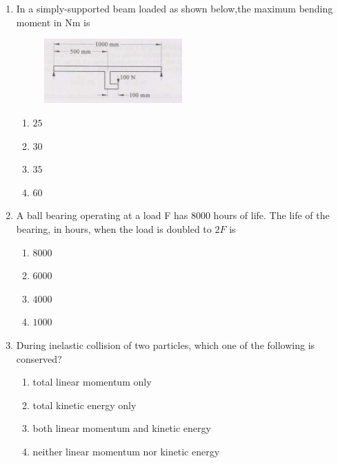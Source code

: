 \documentclass[journal]{IEEEtran}
\begin{document}
\begin{enumerate}
\begin{multicols}{4}
\begin{enumerate}
        \item $\frac{1}{5}$
        \item $0$
        \item $\infty$
    \end{enumerate}
\end{multicols}
\bigskip
\item In a simply-supported beam loaded as shown below,the maximum bending moment in Nm is 
\begin{figure}[h] 
    \centering
    \includegraphics[width=0.5\textwidth]{fig.png} 
\end{figure}
\begin{multicols}{4}
    \begin{enumerate}
        \item $25$
        \item $30$
        \item $35$
        \item $60$
    \end{enumerate}
\end{multicols}
\bigskip
\item A ball bearing operating at a load F has 8000 hours of life. The life of the bearing, in hours, when the load is doubled to $2F$ is
\begin{multicols}{4}
    \begin{enumerate}
        \item $8000$
        \item $6000$
        \item $4000$
        \item $1000$
    \end{enumerate}
\end{multicols}
\bigskip
\item During inelastic collision of two particles, which one of the following is conserved?
\begin{enumerate}
        \item total linear momentum only
        \item total kinetic energy only
        \item both linear momentum and kinetic energy
        \item neither linear momentum nor kinetic energy 

\end{enumerate}
\end{enumerate}
\end{document}
